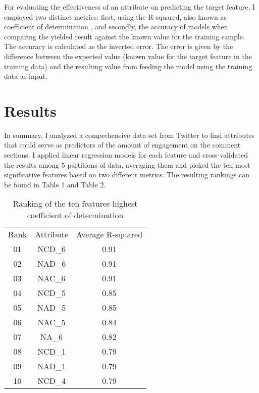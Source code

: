 \documentclass[11pt]{article}
\begin{document}
For evaluating the effectiveness of an attribute on predicting the target feature, I employed two distinct metrics: first, using the R-squared, also known as coefficient of determination \cite{zhang2017coefficient}, and secondly, the accuracy of models when comparing the yielded result against the known value for the training sample. The accuracy is calculated as the inverted error. The error is given by the difference between the expected value (known value for the target feature in the training data) and the resulting value from feeding the model using the training data as input.




\section {Results}
\label{results}
In summary, I analyzed a comprehensive data set from Twitter to find attributes that could serve as predictors of the amount of engagement on the comment sections. I applied linear regression models for each feature and cross-validated the results among 5 partitions of data, averaging them and picked the ten most significative features based on two different metrics. The resulting rankings can be found in Table 1 and Table 2.
\begin{table}[h!]
\centering
\normalsize\begin{tabulary}{1.0\textwidth}{CCC}
Rank & Attribute & Average R-squared \\
01 & NCD\_6 & 0.91 \\
02 & NAD\_6 & 0.91 \\
03 & NAC\_6 & 0.91 \\
04 & NCD\_5 & 0.85 \\
05 & NAD\_5 & 0.85 \\
06 & NAC\_5 & 0.84 \\
07 & NA\_6 & 0.82 \\
08 & NCD\_1 & 0.79 \\
09 & NAD\_1 & 0.79 \\
10 & NCD\_4 & 0.79 \\
\end{tabulary}
\caption{{Ranking of the ten features highest coefficient of determination
{\label{448570}}%
}}
\end{table}
\end{document}

